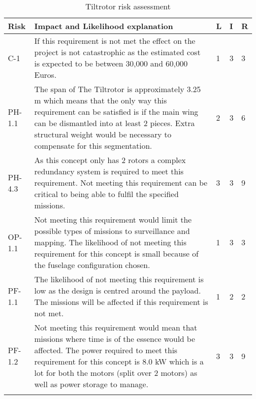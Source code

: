 \begin{table}[]
    \centering
    \caption{Tiltrotor risk assessment}
    \label{tab:tilt_risk_asse}
    \begin{tabularx}{\textwidth}{l L l l l}
        \toprule
        Risk            & Impact and Likelihood explanation                & L     & I     & R
        \\ \midrule
        C-1             & If this requirement is not met the effect on the project is not catastrophic as the estimated cost is expected to be between 30,000 and 60,000 Euros.                                                                                                                       & 1     & 3     & 3
        \\ \hdashline
        PH-1.1          & The span of The Tiltrotor is approximately 3.25 m which means that the only way this requirement can be satisfied is if the main wing can be dismantled into at least 2 pieces. Extra structural weight would be necessary to compensate for this segmentation.             & 2 & 3 & 6
        \\ \hdashline
        PH-4.3          & As this concept only has 2 rotors a complex redundancy system is required to meet this requirement. Not meeting this requirement can be critical to being able to fulfil the specified missions.                                                                            & 3 & 3 & 9
        \\ \hdashline
        OP-1.1          & Not meeting this requirement would limit the possible types of missions to surveillance and mapping. The likelihood of not meeting this requirement for this concept is small because of the fuselage configuration chosen.                                                     & 1 & 3 & 3 
        \\ \hdashline
        PF-1.1          & The likelihood of not meeting this requirement is low as the design is centred around the payload. The missions will be affected if this requirement is not met.                                                                                                                 & 1 & 2 & 2
        \\ \hdashline
        PF-1.2          & Not meeting this requirement would mean that missions where time is of the essence would be affected. The power required to meet this requirement for this concept is 8.0 kW which is a lot for both the motors (split over 2 motors) as well as power storage to manage.     & 3 & 3 & 9
        \\ \hdashline

\end{tabularx}
\end{table}
